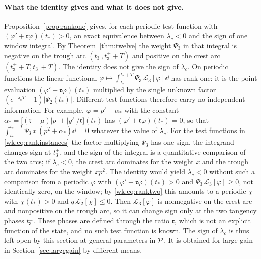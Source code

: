 \paragraph{What the identity gives and what it does not give.}
Proposition~\ref{prop:rankone} gives, for each periodic test function with $(\varphi'+\mathfrak r\varphi)(t_\ast)>0$, an exact equivalence between $\lambda_c<0$ and the sign of one window integral. By Theorem~\ref{thm:twelve} the weight $\Psi_3$ in that integral is negative on the trough arc $(t_3^-,t_3^++T)$ and positive on the crest arc $(t_3^++T,t_3^-+T)$. The identity does not give the sign of $\lambda_c$. On periodic functions the linear functional $\varphi\mapsto\int_{t_\ast}^{t_\ast+T}\Psi_3\,\mathcal L_3[\varphi]\dd$ has rank one: it is the point evaluation $(\varphi'+\mathfrak r\varphi)(t_\ast)$ multiplied by the single unknown factor $(e^{-\lambda_cT}-1)|\Psi_2(t_\ast)|$. Different test functions therefore carry no independent information. For example, $\varphi=p'-\alpha_\ast$ with the constant $\alpha_\ast=\bigl[(\mathfrak r-\mu)|p|+|y'|/\mathfrak r\bigr](t_\ast)$ has $(\varphi'+\mathfrak r\varphi)(t_\ast)=0$, so that $\int_{t_\ast}^{t_\ast+T}\Psi_3\,x\,(p^2+\alpha_\ast)\dd=0$ whatever the value of $\lambda_c$. For the test functions in \eqref{wk:eq:rankinstances} the factor multiplying $\Psi_3$ has one sign, the integrand changes sign at $t_3^\pm$, and the sign of the integral is a quantitative comparison of the two arcs; if $\lambda_c<0$, the crest arc dominates for the weight $x$ and the trough arc dominates for the weight $xp^2$. The identity would yield $\lambda_c<0$ without such a comparison from a periodic $\varphi$ with $(\varphi'+\mathfrak r\varphi)(t_\ast)>0$ and $\Psi_3\,\mathcal L_3[\varphi]\ge0$, not identically zero, on the window; by \eqref{wk:eq:ranktwo} this amounts to a periodic $\chi$ with $\chi(t_\ast)>0$ and $q\,\mathcal L_2[\chi]\le0$. Then $\mathcal L_3[\varphi]$ is nonnegative on the crest arc and nonpositive on the trough arc, so it can change sign only at the two tangency phases $t_3^\pm$. These phases are defined through the ratio $\mathfrak r$, which is not an explicit function of the state, and no such test function is known. The sign of $\lambda_c$ is thus left open by this section at general parameters in $\mathcal P$. It is obtained for large gain in Section~\ref{sec:largegain} by different means.
